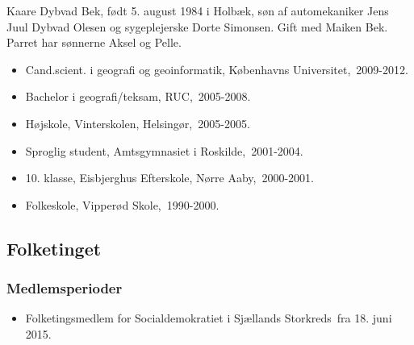 \documentclass[11pt, a4paper]{awesome-cv}
\begin{document}
\makecvheader[R]
\makelettertitle
\begin{cvletter}
Kaare Dybvad Bek, født 5. august 1984 i Holbæk, søn af automekaniker Jens Juul Dybvad Olesen og sygeplejerske Dorte Simonsen. Gift med Maiken Bek. Parret har sønnerne Aksel og Pelle.

\begin{itemize}
\item Cand.scient. i geografi og geoinformatik, Københavns Universitet, 2009-2012.
\item Bachelor i geografi/teksam, RUC, 2005-2008.
\item Højskole, Vinterskolen, Helsingør, 2005-2005.
\item Sproglig student, Amtsgymnasiet i Roskilde, 2001-2004.
\item 10. klasse, Eisbjerghus Efterskole, Nørre Aaby, 2000-2001.
\item Folkeskole, Vipperød Skole, 1990-2000.
\end{itemize}
\subsection*{Folketinget}
\subsubsection*{Medlemsperioder}
\begin{itemize}
\item Folketingsmedlem for Socialdemokratiet i Sjællands Storkreds fra 18. juni 2015.
\end{itemize}

\end{cvletter}
\end{document}
